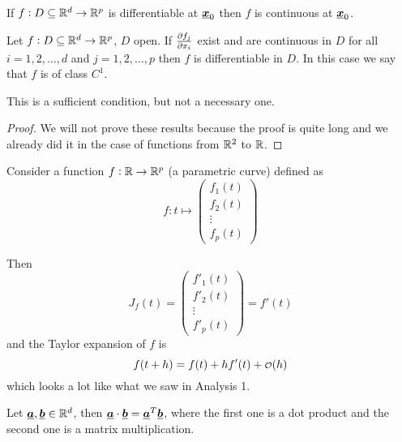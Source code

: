 \documentclass[12pt]{extarticle}
\renewcommand{\vec}[1]{\uvec{#1}}
\begin{document}
\begin{proposition}
    If $f: D \subseteq \mathbb{R}^d \to \mathbb{R}^p$ is differentiable at $\vec{x}_0$ then $f$ is continuous at $\vec{x}_0$.
\end{proposition}

\begin{theorem}
    Let $f: D \subseteq \mathbb{R}^d \to \mathbb{R}^p$, $D$ open. If $\pdv{f_j}{x_i}\/$ exist and are continuous in $D$ for all $i = 1, 2, \ldots, d$ and $j = 1, 2, \ldots, p$ then $f$ is differentiable in $D$.
    In this case we say that $f$ is of class $C^1$.
\end{theorem}
\begin{remark}
    This is a sufficient condition, but not a necessary one.
\end{remark}

\begin{proof}
    We will not prove these results because the proof is quite long and we already did it in the case of functions from $\mathbb{R}^2$ to $\mathbb{R}$.
\end{proof}

\begin{example}
    Consider a function $f: \mathbb{R} \to \mathbb{R}^p$ (a parametric curve) defined as
    \begin{equation}
        f : t \mapsto \begin{pmatrix}
            f_1(t) \\
            f_2(t) \\
            \vdots \\
            f_p(t)
        \end{pmatrix}
    \end{equation}

    Then
    \begin{equation}
        J_f(t) = \begin{pmatrix}
            f'_1(t) \\
            f'_2(t) \\
            \vdots  \\
            f'_p(t)
        \end{pmatrix} = f'(t)
    \end{equation}
    and the Taylor expansion of $f$ is
    \begin{equation}
        f(t + h) = f(t) + h f'(t) + \o(h)
    \end{equation}
    which looks a lot like what we saw in Analysis 1.
\end{example}
\begin{remark}
    Let $\vec{a}, \vec{b} \in \R^d$, then $\vec{a} \cdot \vec{b} = \vec{a}^T \vec{b}$, where the first one is a dot product and the second one is a matrix multiplication.
\end{remark}
\end{document}
